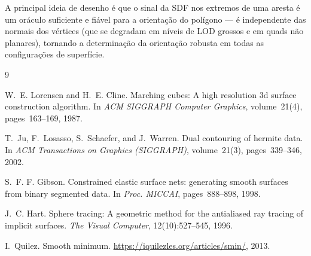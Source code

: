 \documentclass[10pt,a4paper]{article}
\begin{document}
A principal ideia de desenho é que o sinal da SDF nos extremos de
uma aresta é um oráculo suficiente e fiável para a orientação do
polígono — é independente das normais dos vértices (que se degradam
em níveis de LOD grossos e em quads não planares), tornando a
determinação da orientação robusta em todas as configurações de
superfície.

\begin{thebibliography}{9}

W.~E. Lorensen and H.~E. Cline.
\newblock Marching cubes: A high resolution 3d surface construction algorithm.
\newblock In \emph{ACM SIGGRAPH Computer Graphics}, volume~21(4), pages~163--169,
  1987.

T.~Ju, F.~Losasso, S.~Schaefer, and J.~Warren.
\newblock Dual contouring of hermite data.
\newblock In \emph{ACM Transactions on Graphics (SIGGRAPH)}, volume~21(3),
  pages~339--346, 2002.

S.~F. F. Gibson.
\newblock Constrained elastic surface nets: generating smooth surfaces from
  binary segmented data.
\newblock In \emph{Proc. MICCAI}, pages~888--898, 1998.

J.~C. Hart.
\newblock Sphere tracing: A geometric method for the antialiased ray tracing of
  implicit surfaces.
\newblock \emph{The Visual Computer}, 12(10):527--545, 1996.

I.~Quilez.
\newblock Smooth minimum.
\newblock \url{https://iquilezles.org/articles/smin/}, 2013.

\end{thebibliography}
\end{document}
